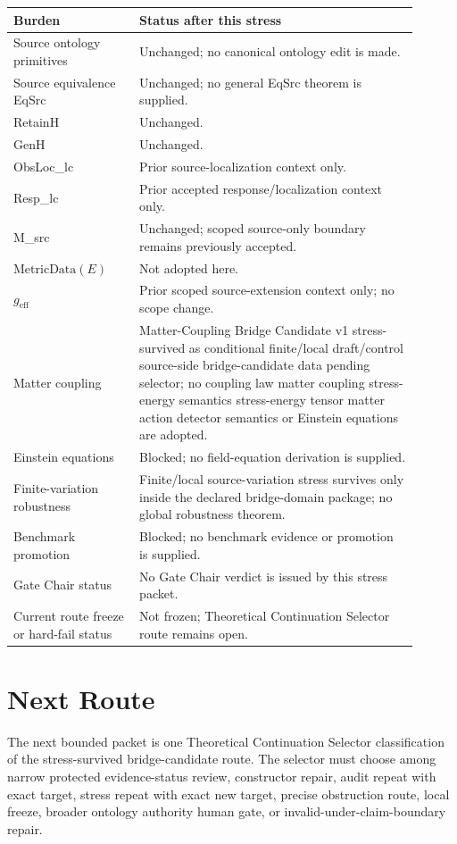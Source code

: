 \documentclass[11pt]{article}
\newcommand{\MetricData}{\mathrm{MetricData}}
\newcommand{\geff}{g_{\mathrm{eff}}}
\begin{document}
\begin{longtable}{p{0.28\linewidth}p{0.62\linewidth}}
\toprule
Burden & Status after this stress \\
\midrule
Source ontology primitives & Unchanged; no canonical ontology edit is made. \\
Source equivalence EqSrc & Unchanged; no general EqSrc theorem is supplied. \\
RetainH & Unchanged. \\
GenH & Unchanged. \\
ObsLoc\_lc & Prior source-localization context only. \\
Resp\_lc & Prior accepted response/localization context only. \\
M\_src & Unchanged; scoped source-only boundary remains previously accepted. \\
\(\MetricData(E)\) & Not adopted here. \\
\(\geff\) & Prior scoped source-extension context only; no scope change. \\
Matter coupling & Matter-Coupling Bridge Candidate v1 stress-survived as conditional finite/local draft/control source-side bridge-candidate data pending selector; no coupling law matter coupling stress-energy semantics stress-energy tensor matter action detector semantics or Einstein equations are adopted. \\
Einstein equations & Blocked; no field-equation derivation is supplied. \\
Finite-variation robustness & Finite/local source-variation stress survives only inside the declared bridge-domain package; no global robustness theorem. \\
Benchmark promotion & Blocked; no benchmark evidence or promotion is supplied. \\
Gate Chair status & No Gate Chair verdict is issued by this stress packet. \\
Current route freeze or hard-fail status & Not frozen; Theoretical Continuation Selector route remains open. \\
\bottomrule
\end{longtable}

\section{Next Route}

The next bounded packet is one Theoretical Continuation Selector
classification of the stress-survived bridge-candidate route. The selector
must choose among narrow protected evidence-status review, constructor repair,
audit repeat with exact target, stress repeat with exact new target, precise
obstruction route, local freeze, broader ontology authority human gate, or
invalid-under-claim-boundary repair.
\end{document}
